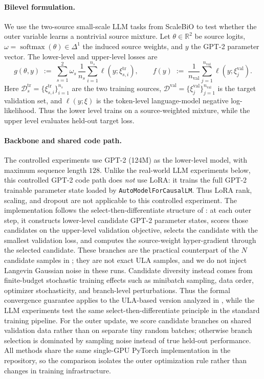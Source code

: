 \documentclass{article}
\theoremstyle{normaltheorem}
\newcommand{\R}{\mathbb{R}}
\newcommand{\softmax}{\operatorname{softmax}}
\begin{document}
\paragraph{Bilevel formulation.}
We use the two-source small-scale LLM tasks from ScaleBiO \citep{pan2025scalebio} to test whether the outer variable learns a nontrivial source mixture. Let \(\theta\in\R^2\) be source logits, \(\omega=\softmax(\theta)\in\Delta^1\) the induced source weights, and \(y\) the GPT-2 parameter vector. The lower-level and upper-level losses are
\[
g(\theta,y)
\;:=\;
\sum_{s=1}^2 \omega_s\,
\frac{1}{n_s}\sum_{i=1}^{n_s}\ell(y;\xi^{\mathrm{tr}}_{s,i}),
\qquad
f(y)
\;:=\;
\frac{1}{n_{\mathrm{val}}}\sum_{j=1}^{n_{\mathrm{val}}}\ell(y;\xi^{\mathrm{val}}_{j}).
\]
Here \(\mathcal D^{\mathrm{tr}}_s=\{\xi^{\mathrm{tr}}_{s,i}\}_{i=1}^{n_s}\) are the two training sources, \(\mathcal D^{\mathrm{val}}=\{\xi^{\mathrm{val}}_j\}_{j=1}^{n_{\mathrm{val}}}\) is the target validation set, and \(\ell(y;\xi)\) is the token-level language-model negative log-likelihood. Thus the lower level trains on a source-weighted mixture, while the upper level evaluates held-out target loss.

\paragraph{Backbone and shared code path.}
The controlled experiments use GPT-2 (124M) \citep{radford2019language} as the lower-level model, with maximum sequence
length \(128\). Unlike the real-world LLM experiments below, this controlled GPT-2 code path does \emph{not} use LoRA:
it trains the full GPT-2 trainable parameter state loaded by \texttt{AutoModelForCausalLM}. Thus LoRA rank, scaling, and
dropout are not applicable to this controlled experiment.
The implementation follows the select-then-differentiate structure of : at each outer step, it
constructs lower-level candidate GPT-2 parameter states, scores those candidates on the upper-level validation objective,
selects the candidate with the smallest validation loss, and computes the source-weight hyper-gradient through the
selected candidate. These branches are the practical counterpart of the \(N\) candidate samples in ;
they are not exact ULA samples, and we do not inject Langevin Gaussian noise in these runs. Candidate diversity instead
comes from finite-budget stochastic training effects such as minibatch sampling, data order, optimizer stochasticity, and
branch-level perturbations. Thus the formal convergence guarantee applies to the ULA-based version analyzed in
, while the LLM experiments test the same select-then-differentiate principle in the standard training
pipeline. For the outer update, we score candidate branches on shared validation data rather than on separate tiny random
batches; otherwise branch selection is dominated by sampling noise instead of true held-out performance. All methods share
the same single-GPU PyTorch implementation in the repository, so the comparison isolates the outer optimization rule
rather than changes in training infrastructure.
\end{document}
